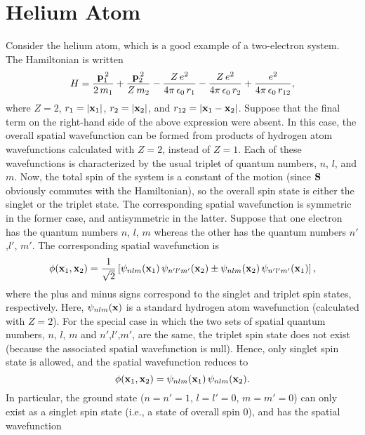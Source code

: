 \section{Helium Atom}
Consider the helium atom, which is a good example of a two-electron system. The Hamiltonian is written
\begin{equation}\label{e10.54t}
H = \frac{{\bf p}_1^{\,2}}{2\,m_1} + \frac{{\bf p}_2^{\,2}}{Z\,m_2} - \frac{Z\,e^2}{4\pi\,\epsilon_0\,r_1} -\frac{Z\,e^2}{4\pi\,\epsilon_0\,r_2}
+ \frac{e^2}{4\pi\,\epsilon_0\,r_{12}},
\end{equation}
where $Z=2$, $r_1=|{\bf x}_1|$, $r_2=|{\bf x}_2|$, and $r_{12} = |{\bf x}_1-{\bf x}_2|$. Suppose that the final term on the right-hand side of the above expression were absent. In this case, the overall spatial wavefunction can be formed from products of  hydrogen atom wavefunctions calculated with
$Z=2$, instead of $Z=1$. Each of these wavefunctions is characterized by the usual triplet of quantum numbers, $n$, $l$, and $m$. 
Now, the total spin of the system is a constant of the motion (since ${\bf S}$ obviously commutes with the Hamiltonian), 
so the overall spin state is either the singlet or the triplet state. The corresponding spatial wavefunction is symmetric in the former case, and
antisymmetric in the latter. Suppose that one electron has the quantum numbers $n$, $l$, $m$ whereas the other has the quantum numbers $n'$ ,$l'$, $m'$. 
The corresponding spatial wavefunction is
\begin{equation}\label{e10.55t}
\phi({\bf x}_1,{\bf x}_2)=\frac{1}{\sqrt{2}}\left[\psi_{nlm}({\bf x}_1)\,\psi_{n'l'm'}({\bf x}_2)\pm \psi_{nlm}({\bf x}_2)\,\psi_{n'l'm'}({\bf x}_1)\right],
\end{equation}
where the plus and minus signs correspond to the singlet and triplet spin states, respectively. Here, $\psi_{nlm}({\bf x})$
is a standard hydrogen atom wavefunction (calculated with $Z=2$). For the special case in which the two sets of spatial quantum numbers, $n$, $l$, $m$
and $n'$,$l'$,$m'$, are the same, the triplet spin state does not exist (because the associated spatial wavefunction is null). Hence, only
singlet spin state is allowed, and the spatial wavefunction reduces to
\begin{equation}
\phi({\bf x}_1,{\bf x}_2)=\psi_{nlm}({\bf x}_1)\,\psi_{nlm}({\bf x}_2).
\end{equation}
In particular, the ground state ($n=n'=1$, $l=l'=0$, 	$m=m'=0$) can only exist as a singlet spin state (i.e., a state of overall spin 0), and has the
spatial wavefunction
